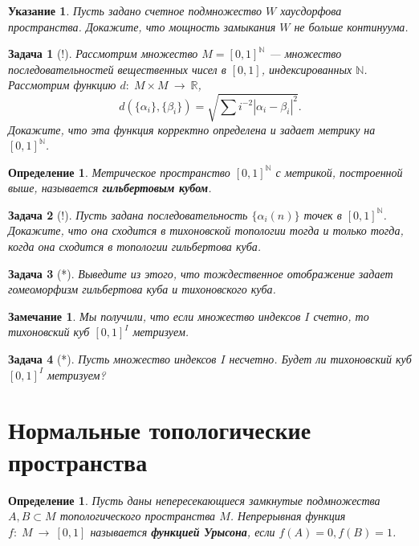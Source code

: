 \documentclass[12pt]{book}
\newcommand{\subs}{\section}
\newcommand{\arrow}{{\:\longrightarrow\:}}
\def\R{{\mathbb R}}
\def\N{{\mathbb N}}
\theoremstyle{upshape}
\newtheorem{zadacha}{Задача}[chapter]
\theoremstyle{generic}
\newtheorem{opredelenie}[teorema]{Определение}
\theoremstyle{upshapenonumber}
\newtheorem{ukazanie}{Указание}[section]
\newtheorem{zamechanie}{Замечание}[chapter]
\newcommand{\следствие}{%
     \refstepcounter{teorema}
     {\noindent\bf Следствие \thechapter.\arabic{teorema}:\ }}
\newcommand{\пример}{%
     \refstepcounter{teorema}
     {\noindent\bf Пример \thechapter.\arabic{teorema}:\ }}
\newcommand{\лемма}{%
     \refstepcounter{teorema}
     {\noindent\bf Лемма \thechapter.\arabic{teorema}:\ }}
\newcommand{\теорема}{%
     \refstepcounter{teorema}
     {\noindent\bf Теорема \thechapter.\arabic{teorema}:\ }}
\newcommand{\утверждение}{%
     \refstepcounter{teorema}
     {\noindent\bf Утверждение \thechapter.\arabic{teorema}:\ }}
\begin{document}
{\begin{ukazanie}
Пусть задано счетное подмножество $W$ хаусдорфова
пространства. Докажите, что мощность замыкания $W$ 
не больше континуума.
\end{ukazanie}

\begin{zadacha}[!]
Рассмотрим множество $M=[0,1]^\N$ --- множество последовательностей
вещественных чисел в $[0,1]$, индексированных $\N$. Рассмотрим
функцию $d:\; M\times M\arrow \R$,
\[ 
d(\{\alpha_i\}, \{\beta_i\})= \sqrt{\sum i^{-2}|\alpha_i-\beta_i|^2}.
\]
Докажите, что эта функция корректно определена и задает
метрику на $[0,1]^\N$.
\end{zadacha}

\begin{opredelenie}
Метрическое пространство $[0,1]^\N$ с метрикой, построенной выше,
называется {\bf гильбертовым кубом}.
\end{opredelenie}

\begin{zadacha}[!]
Пусть задана последовательность $\{\alpha_i(n)\}$ точек в
$[0,1]^\N$.  Докажите, что она сходится в тихоновской топологии
тогда и только тогда, когда она сходится в топологии гильбертова
куба.
\end{zadacha}

\begin{zadacha}[*] 
Выведите из этого, что тождественное отображение задает гомеоморфизм
гильбертова куба и тихоновского куба.
\end{zadacha}

\begin{zamechanie}
Мы получили, что если множество индексов $I$ счетно, то тихоновский
куб $[0,1]^I$ метризуем.
\end{zamechanie}

\begin{zadacha}[*] 
Пусть множество индексов $I$ несчетно.  Будет ли тихоновский куб
$[0,1]^I$ метризуем?
\end{zadacha}


\subs{Нормальные топологические пространства}

\begin{opredelenie}
Пусть даны непересекающиеся замкнутые подмножества $A, B\subset M$
топологического пространства $M$. Непрерывная функция $f:\; M \arrow
[0,1]$ называется {\bf функцией Урысона}, если $f(A)=0, f(B)=1$.
\end{opredelenie}

}
\end{document}

